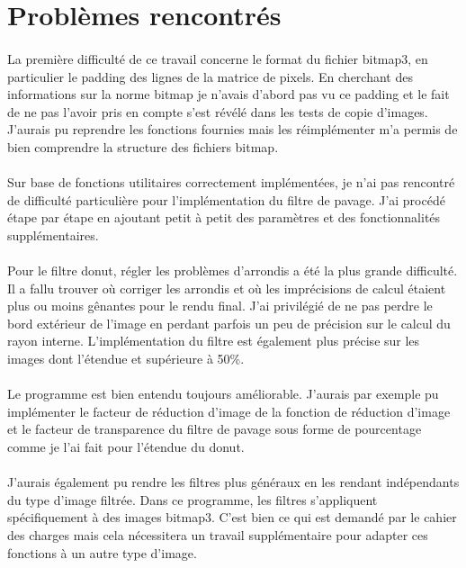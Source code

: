 \documentclass{article}
\begin{document}
    \newpage
    \section{Problèmes rencontrés}
    \paragraph{}
    La première difficulté de ce travail concerne le format du fichier bitmap3, en particulier le padding des lignes de la matrice de pixels. En cherchant des informations sur la norme bitmap je n'avais d'abord pas vu ce padding et le fait de ne pas l'avoir pris en compte s'est révélé dans les tests de copie d'images. J'aurais pu reprendre les fonctions fournies mais les réimplémenter m'a permis de bien comprendre la structure des fichiers bitmap.

    \paragraph{}
    Sur base de fonctions utilitaires correctement implémentées, je n'ai pas rencontré de difficulté particulière pour l'implémentation du filtre de pavage. J'ai procédé étape par étape en ajoutant petit à petit des paramètres et des fonctionnalités supplémentaires.

    \paragraph{}
    Pour le filtre donut, régler les problèmes d'arrondis a été la plus grande difficulté. Il a fallu trouver où corriger les arrondis et où les imprécisions de calcul étaient plus ou moins gênantes pour le rendu final. J'ai privilégié de ne pas perdre le bord extérieur de l'image en perdant parfois un peu de précision sur le calcul du rayon interne. L'implémentation du filtre est également plus précise sur les images dont l'étendue et supérieure à 50\%.

    \paragraph{}
    Le programme est bien entendu toujours améliorable. J'aurais par exemple pu implémenter le facteur de réduction d'image de la fonction de réduction d'image et le facteur de transparence du filtre de pavage sous forme de pourcentage comme je l'ai fait pour l'étendue du donut.

    \paragraph{}
    J'aurais également pu rendre les filtres plus généraux en les rendant indépendants du type d'image filtrée. Dans ce programme, les filtres s'appliquent spécifiquement à des images bitmap3. C'est bien ce qui est demandé par le cahier des charges mais cela nécessitera un travail supplémentaire pour adapter ces fonctions à un autre type d'image.
    
\end{document}

